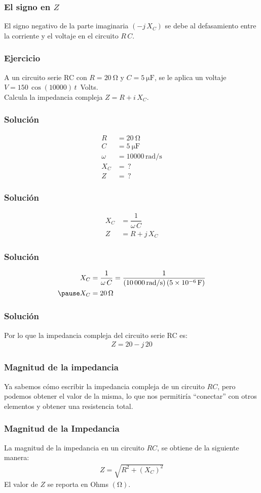 \documentclass[14pt]{beamer}
\begin{document}
\begin{frame}
\frametitle{El signo en $Z$}
El signo negativo de la parte imaginaria $(- j \, X_{C})$ se debe al defasamiento entre la corriente y el voltaje en el circuito $R \, C$.
\end{frame}
\begin{frame}
\frametitle{Ejercicio}
A un circuito serie RC con $R = \SI{20}{\ohm}$ y $C = \SI{5}{\micro\farad}$, se le aplica un voltaje $V = \num{150} \, \cos (\num{10000}) \, t $\, Volts.
\\
\bigskip
\pause
Calcula la impedancia compleja $Z = R + i \, X_{C}$.
\end{frame}
\begin{frame}
\frametitle{Solución}
\vspace*{-1cm}
\begin{align*}
R &= \SI{20}{\ohm} \\
C &= \SI{5}{\micro\farad} \\
\omega &= \num{10000} \, \text{rad/s} \\
X_{C} &= \,?  \\
Z &= \, ?
\end{align*} 
\end{frame}
\begin{frame}
\frametitle{Solución}
\pause
\begin{align*}
X_{C} &= \dfrac{1}{\omega \, C} \\[0.5em]
Z &= R + j \, X_{C}
\end{align*}
\end{frame}
\begin{frame}
\frametitle{Solución}
\begin{eqnarray*}
\begin{aligned}
X_{C} &= \dfrac{1}{\omega \, C} = \dfrac{1}{(\num{10000} \, \text{rad/s})\left( \SI{5d-6}{\farad} \right)} \\ \pause
X_{C} &= \SI{20}{\ohm}
\end{aligned}
\end{eqnarray*}
\end{frame}
\begin{frame}
\frametitle{Solución}
Por lo que la impedancia compleja del circuito serie RC es:
\pause
\begin{align*}
Z = 20 - j \, 20
\end{align*}
\end{frame}
\begin{frame}
\frametitle{Magnitud de la impedancia}
Ya sabemos cómo escribir la impedancia compleja de un circuito $RC$, \pause pero podemos obtener el valor de la misma, lo que nos permitiría \enquote{conectar} con otros elementos y obtener una resistencia total.
\end{frame}
\begin{frame}
\frametitle{Magnitud de la Impedancia}
La magnitud de la impedancia en un circuito $RC$, se obtiene de la siguiente manera:
\pause
\begin{align*}
Z = \sqrt{R^{2} + \left( X_{C} \right)^{2}}
\end{align*}
El valor de $Z$ se reporta en Ohms $(\si{\ohm})$.
\end{frame}
\end{document}
